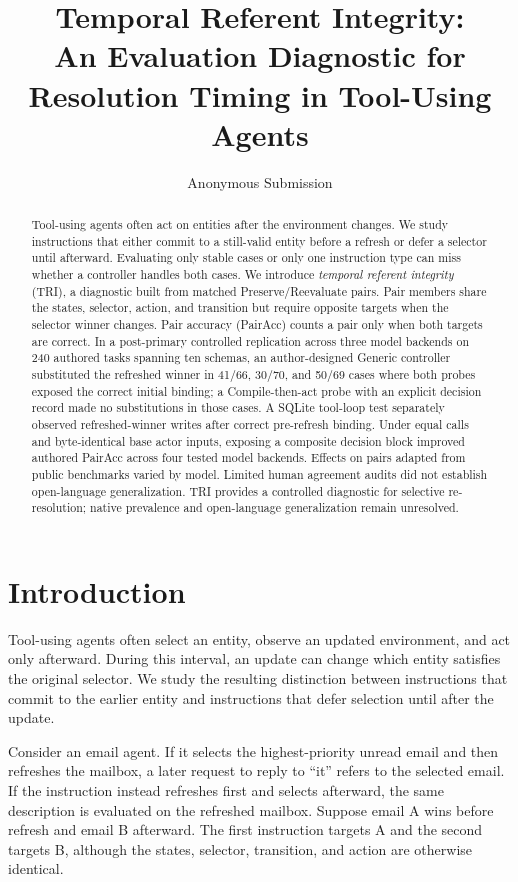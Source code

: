 \documentclass[letterpaper]{article}
\title{Temporal Referent Integrity:\\
An Evaluation Diagnostic for Resolution Timing in Tool-Using Agents}
\author{Anonymous Submission}
\begin{document}
\maketitle

\begin{abstract}
Tool-using agents often act on entities after the environment changes. We study instructions that
either commit to a still-valid entity before a refresh or defer a selector until afterward.
Evaluating only stable cases or only one instruction type can miss whether a controller handles
both cases. We introduce \emph{temporal referent integrity} (TRI), a diagnostic built from matched
Preserve/Reevaluate pairs. Pair members share the states, selector, action, and transition but
require opposite targets when the selector winner changes. Pair accuracy (PairAcc) counts a pair
only when both targets are correct. In a post-primary controlled replication across three model
backends on 240 authored tasks spanning ten schemas, an author-designed Generic controller
substituted the refreshed winner in 41/66, 30/70,
and 50/69 cases where both probes exposed the correct initial binding; a Compile-then-act probe
with an explicit decision record made no substitutions in those cases. A SQLite tool-loop test
separately observed refreshed-winner writes after correct pre-refresh binding. Under equal calls
and byte-identical base actor inputs, exposing a composite decision block improved authored PairAcc
across four tested model backends.
Effects on pairs adapted from public benchmarks varied by model. Limited human agreement audits
did not establish open-language generalization. TRI provides a controlled diagnostic for selective
re-resolution; native prevalence and open-language generalization remain unresolved.
\end{abstract}

\section{Introduction}

Tool-using agents often select an entity, observe an updated environment, and act only afterward.
During this interval, an update can change which entity satisfies the original selector. We study
the resulting distinction between instructions that commit to the earlier entity and instructions
that defer selection until after the update.

Consider an email agent. If it selects the highest-priority unread email and then refreshes the
mailbox, a later request to reply to ``it'' refers to the selected email. If the instruction instead
refreshes first and selects afterward, the same description is evaluated on the refreshed mailbox.
Suppose email A wins before refresh and email B afterward. The first instruction targets A and the
second targets B, although the states, selector, transition, and action are otherwise identical.
\end{document}
